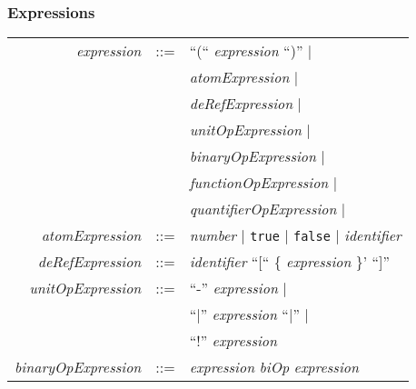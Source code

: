 \documentclass{article}
\begin{document}
\subsubsection{Expressions}
\begin{tabular}{rcl}


\textit{expression} & ::= & ``(`` \textit{expression} ``)'' $\mid$\\
                    &     & \textit{atomExpression} $\mid$\\
                    &     & \textit{deRefExpression} $\mid$\\
                    &     & \textit{unitOpExpression} $\mid$\\
                    &     & \textit{binaryOpExpression} $\mid$\\
                    &     & \textit{functionOpExpression} $\mid$\\
                    &     & \textit{quantifierOpExpression} $\mid$\\

\textit{atomExpression} & ::= & \textit{number} $\mid$ \texttt{true} $\mid$ \texttt{false} $\mid$ \textit{identifier} \\
\textit{deRefExpression} & ::= & \textit{identifier} ``[`` \{ \textit{expression} \}'  ``]'' \\
\textit{unitOpExpression} & ::= & ``-'' \textit{expression} $\mid$ \\
                          &     & ``$\mid$'' \textit{expression} ``$\mid$'' $\mid$ \\
                          &     & ``!'' \textit{expression}\\
\textit{binaryOpExpression} & ::= & \textit{expression} \textit{biOp} \textit{expression}\\


\end{tabular}
\end{document}
